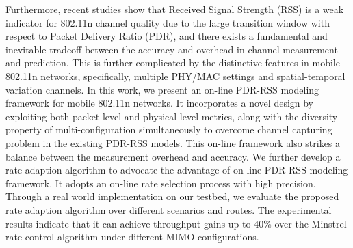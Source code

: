 \begin{englishabstract}
Furthermore, recent studies show that Received Signal Strength (RSS) is a weak indicator for 802.11n channel quality due to the large transition window with respect to Packet Delivery Ratio (PDR), and there exists a fundamental and inevitable tradeoff between the accuracy and overhead in channel measurement and prediction. This is further complicated by the distinctive features in mobile 802.11n networks, specifically, multiple PHY/MAC settings and spatial-temporal variation channels. In this work, we present an on-line PDR-RSS modeling framework for mobile 802.11n networks. It incorporates a novel design by exploiting both packet-level and physical-level metrics, along with the diversity property of multi-configuration simultaneously to overcome channel capturing problem in the existing PDR-RSS models. This on-line framework also strikes a balance between the measurement overhead and accuracy. We further develop a rate adaption algorithm to advocate the advantage of on-line PDR-RSS modeling framework. It adopts an on-line rate selection process with high precision. Through a real world implementation on our testbed, we evaluate the proposed rate adaption algorithm over different scenarios and routes. The experimental results indicate that it can achieve throughput gains up to 40\% over the Minstrel rate control algorithm under different MIMO configurations.

\end{englishabstract}
